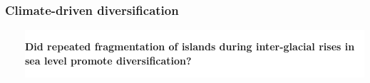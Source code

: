 
{
\begin{frame}
    \frametitle{Climate-driven diversification}    
    \begin{columns}
        \ \\


        \vspace{-2cm}

        \colorbox{white}{
            \begin{minipage}[t]{1.0\textwidth}
                \raggedright
                \textbf{Did repeated fragmentation of islands during
                    inter-glacial rises in sea level promote diversification?}
            \end{minipage}
        }
    \end{columns}
\end{frame}
}

